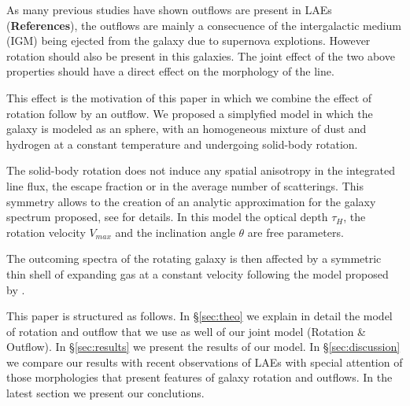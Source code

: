\documentclass{latex/emulateapj}
\begin{document}
As many previous studies have shown outflows are present in LAEs (\textbf{References}),
the outflows are mainly a consecuence of the intergalactic medium (IGM) being ejected 
from the galaxy due to supernova explotions.
However rotation should also be present in this galaxies. The joint effect of the two 
above properties should have a direct effect on the morphology of the \lya line.

This effect is the motivation of this paper in which we combine the effect of rotation 
follow by an outflow. We proposed a simplyfied model in which the galaxy is modeled
as an sphere, with an homogeneous mixture of dust and hydrogen at a constant temperature
and undergoing solid-body rotation.  

The solid-body rotation does not induce any spatial anisotropy in the integrated line flux, 
the escape fraction or in the average number of scatterings. This symmetry allows 
to the creation of an analytic approximation for the galaxy spectrum 
proposed, see \cite{Garavito14} for details. In this model the optical depth $\tau_{H}$, the 
rotation velocity $V_{max}$ and the inclination angle $\theta$ are free parameters.
 
The outcoming spectra of the rotating galaxy is then affected by a symmetric thin shell of expanding
gas at a constant velocity following the model proposed by \cite{2014arXiv1404.2958V, Orsi12}.  

This paper is structured as follows. In \S \ref{sec:theo} we explain in detail the model of rotation
and outflow that we use as well of our joint model (Rotation \& Outflow). In \S \ref{sec:results} we present
the results of our model. In \S \ref{sec:discussion} we compare our results with 
recent observations of LAEs with special attention of those morphologies that present
features of galaxy rotation and outflows. In the latest section we present our 
conclutions.



\end{document}
